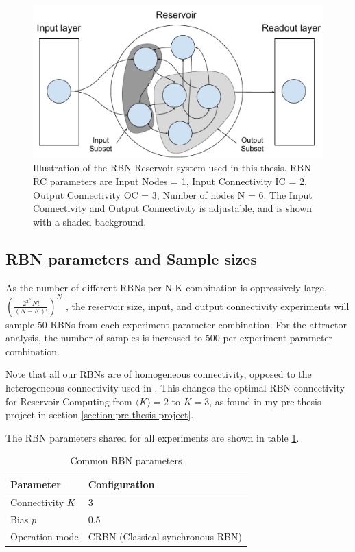 \begin{figure}
    \centering
    \caption[Illustration of the RBN reservoir computing system used in this thesis]{
        Illustration of the RBN Reservoir system used in this thesis.
        RBN RC parameters are Input Nodes = 1, Input Connectivity IC = 2, Output Connectivity OC = 3, Number of nodes N = 6.
        The Input Connectivity and Output Connectivity is adjustable,
        and is shown with a shaded background.
    }
    \label{figure:rbn-reservoir-subsets}
    \includegraphics[width=\columnwidth]{method/rbn_reservoir_subsets.pdf}
\end{figure}

\subsection{RBN parameters and Sample sizes}

As the number of different RBNs per N-K combination is oppressively large,
$(\frac{2^{2^{K}}N!}{(N-K)!})^N$ \cite{gershenson2004introduction},
the reservoir size, input, and output connectivity experiments will sample 50 RBNs from each experiment parameter combination.
For the attractor analysis, the number of samples is increased to 500 per experiment parameter combination.

Note that all our RBNs are of homogeneous connectivity,
opposed to the heterogeneous connectivity used in \cite{rbn-reservoir}.
This changes the optimal RBN connectivity for Reservoir Computing from $ \langle K \rangle = 2 $ to $ K = 3$,
as found in my pre-thesis project in section \ref{section:pre-thesis-project}.

The RBN parameters shared for all experiments are shown in table
\ref{table:shared-rbn-parameters}.

\begin{table}[h]
    \centering
    \caption{Common RBN parameters}
    \label{table:shared-rbn-parameters}
    \begin{tabular}{ll}
        \hline
        \textbf{Parameter} & \textbf{Configuration} \\
        \hline
        \hline
        Connectivity $K$ & 3   \\
        Bias $p$         & 0.5 \\
        Operation mode & CRBN (Classical synchronous RBN) \\
        \hline
    \end{tabular}
\end{table}

